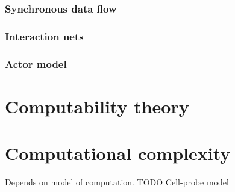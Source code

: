 \subsubsection{Synchronous data flow}
\subsubsection{Interaction nets}
\subsubsection{Actor model}
\section{Computability theory}
\section{Computational complexity}
Depends on model of computation. TODO Cell-probe model